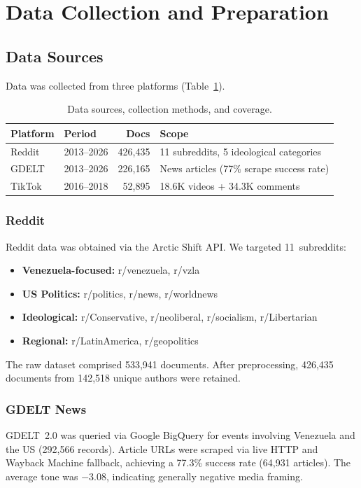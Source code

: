 \documentclass[12pt, a4paper]{article}
\begin{document}
\section{Data Collection and Preparation}
\label{sec:data}

\subsection{Data Sources}

Data was collected from three platforms (Table~\ref{tab:data-sources}).

\begin{table}[H]
\centering
\caption{Data sources, collection methods, and coverage.}
\label{tab:data-sources}
\begin{tabular}{@{}llrp{4.8cm}@{}}
\toprule
\textbf{Platform} & \textbf{Period} & \textbf{Docs} & \textbf{Scope} \\
\midrule
Reddit & 2013--2026 & 426,435 & 11 subreddits, 5 ideological categories \\
GDELT  & 2013--2026 & 226,165 & News articles (77\% scrape success rate) \\
TikTok & 2016--2018 & 52,895  & 18.6K videos + 34.3K comments \\
\bottomrule
\end{tabular}
\end{table}

\subsubsection{Reddit}
Reddit data was obtained via the Arctic Shift API. We targeted 11~subreddits:
\begin{itemize}[leftmargin=*, nosep]
  \item \textbf{Venezuela-focused:} r/venezuela, r/vzla
  \item \textbf{US Politics:} r/politics, r/news, r/worldnews
  \item \textbf{Ideological:} r/Conservative, r/neoliberal, r/socialism, r/Libertarian
  \item \textbf{Regional:} r/LatinAmerica, r/geopolitics
\end{itemize}
The raw dataset comprised 533,941 documents. After preprocessing, 426,435 documents from 142,518 unique authors were retained.

\subsubsection{GDELT News}
GDELT~2.0 was queried via Google BigQuery for events involving Venezuela and the US (292,566 records). Article URLs were scraped via live HTTP and Wayback Machine fallback, achieving a 77.3\% success rate (64,931 articles). The average tone was $-3.08$, indicating generally negative media framing.
\end{document}
